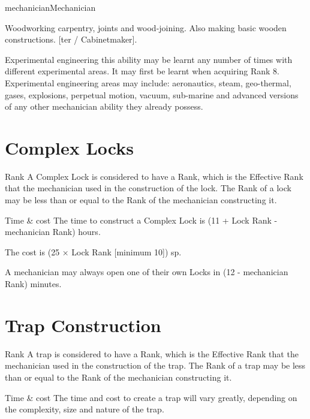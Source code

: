 \begin{Skill}[2.2]{mechanician}{Mechanician}
\begin{Description}
\item[Woodworking] carpentry, joints and wood-joining.  Also making
  basic wooden constructions. [ter / Cabinetmaker].

\item[Experimental] engineering this ability may be learnt any number
  of times with different experimental areas. It may first be learnt
  when acquiring Rank 8.  Experimental engineering areas may include:
  aeronautics, steam, geo-thermal, gases, explosions, perpetual
  motion, vacuum, sub-marine and advanced versions of any other
  mechanician ability they already possess.

  \end{Description}

\section{Complex Locks}

\begin{Description}

\item[Rank] A Complex Lock is considered to have a Rank, which is the
  Effective Rank that the mechanician used in the construction of the
  lock.  The Rank of a lock may be less than or equal to the Rank of
  the mechanician constructing it.

\item[Time \& cost] The time to construct a Complex Lock is (11 + Lock
  Rank - mechanician Rank) hours.

The cost is (25 × Lock Rank [minimum 10]) sp. 

A mechanician may always open one of their own Locks in (12 -
mechanician Rank) minutes.

\end{Description}

\section{Trap Construction}

\begin{Description}

\item[Rank] A trap is considered to have a Rank, which is the
  Effective Rank that the mechanician used in the construction of the
  trap.  The Rank of a trap may be less than or equal to the Rank of
  the mechanician constructing it.

\item[Time \& cost] The time and cost to create a trap will vary
  greatly, depending on the complexity, size and nature of the trap.


\end{Description}
\end{Skill}
